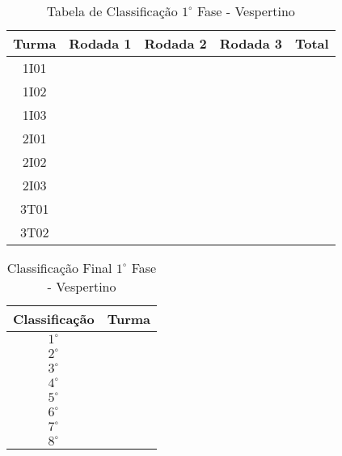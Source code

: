 \documentclass[10pt]{article}
\begin{document}
    \begin{table}[H]
        \caption{Tabela de Classificação $1^\circ$ Fase - Vespertino}
        \label{tab:tab-matutino}
        \begin{center}
            \begin{tabular}{|c|c|c|c|c|}
                \hline
                \textbf{Turma} & \textbf{Rodada 1} & \textbf{Rodada 2} & \textbf{Rodada 3} & \textbf{Total} \\ \hline
                1I01 & & & & \\ \hline
                1I02 & & & & \\ \hline
                1I03 & & & & \\ \hline
                2I01 & & & & \\ \hline
                2I02 & & & & \\ \hline
                2I03 & & & & \\ \hline
                3T01 & & & & \\ \hline
                3T02 & & & & \\ \hline
            \end{tabular}
        \end{center}
    \end{table}

    \begin{table}[H]
        \caption{Classificação Final $1^\circ$ Fase - Vespertino}
        \label{tab:tab-matutino}
        \begin{center}
            \begin{tabular}{|c|c|}
                \hline
                \textbf{Classificação} & \textbf{Turma}\\ \hline
                $1^\circ$ & \\ \hline
                $2^\circ$ & \\ \hline
                $3^\circ$ & \\ \hline
                $4^\circ$ & \\ \hline
                $5^\circ$ & \\ \hline
                $6^\circ$ & \\ \hline
                $7^\circ$ & \\ \hline
                $8^\circ$ & \\ \hline
            \end{tabular}
        \end{center}
    \end{table}
\end{document}

